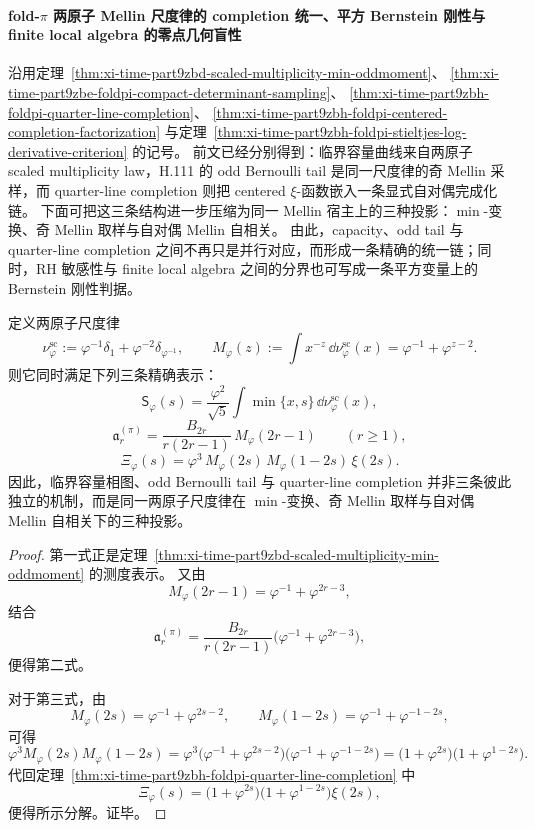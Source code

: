 \paragraph{fold-\texorpdfstring{$\pi$}{pi} 两原子 Mellin 尺度律的 completion 统一、平方 Bernstein 刚性与 finite local algebra 的零点几何盲性}
沿用定理~\ref{thm:xi-time-part9zbd-scaled-multiplicity-min-oddmoment}、
\ref{thm:xi-time-part9zbe-foldpi-compact-determinant-sampling}、
\ref{thm:xi-time-part9zbh-foldpi-quarter-line-completion}、
\ref{thm:xi-time-part9zbh-foldpi-centered-completion-factorization}
与定理~\ref{thm:xi-time-part9zbh-foldpi-stieltjes-log-derivative-criterion} 的记号。
前文已经分别得到：临界容量曲线来自两原子 scaled multiplicity law，H.111 的 odd Bernoulli tail 是同一尺度律的奇 Mellin 采样，而 quarter-line completion 则把 centered \(\xi\)-函数嵌入一条显式自对偶完成化链。
下面可把这三条结构进一步压缩为同一 Mellin 宿主上的三种投影：\(\min\)-变换、奇 Mellin 取样与自对偶 Mellin 自相关。
由此，capacity、odd tail 与 quarter-line completion 之间不再只是并行对应，而形成一条精确的统一链；同时，RH 敏感性与 finite local algebra 之间的分界也可写成一条平方变量上的 Bernstein 刚性判据。

\begin{theorem}\label{thm:xi-time-part9zbha-twoatomic-mellin-triple-unification}
定义两原子尺度律
\[
\nu_\varphi^{\mathrm{sc}}
:=
\varphi^{-1}\delta_1+\varphi^{-2}\delta_{\varphi^{-1}},
\qquad
M_\varphi(z)
:=
\int x^{-z}\,\dd\nu_\varphi^{\mathrm{sc}}(x)
=
\varphi^{-1}+\varphi^{z-2}.
\]
则它同时满足下列三条精确表示：
\[
\mathsf S_\varphi(s)
=
\frac{\varphi^2}{\sqrt5}
\int \min\{x,s\}\,\dd\nu_\varphi^{\mathrm{sc}}(x),
\]
\[
\mathfrak a_r^{(\pi)}
=
\frac{B_{2r}}{r(2r-1)}\,M_\varphi(2r-1)
\qquad (r\ge 1),
\]
\[
\Xi_\varphi(s)
=
\varphi^3\,M_\varphi(2s)\,M_\varphi(1-2s)\,\xi(2s).
\]
因此，临界容量相图、odd Bernoulli tail 与 quarter-line completion 并非三条彼此独立的机制，而是同一两原子尺度律在 \(\min\)-变换、奇 Mellin 取样与自对偶 Mellin 自相关下的三种投影。
\end{theorem}
\begin{proof}
第一式正是定理~\ref{thm:xi-time-part9zbd-scaled-multiplicity-min-oddmoment} 的测度表示。
又由
\[
M_\varphi(2r-1)
=
\varphi^{-1}+\varphi^{2r-3},
\]
结合
\[
\mathfrak a_r^{(\pi)}
=
\frac{B_{2r}}{r(2r-1)}
\bigl(\varphi^{-1}+\varphi^{2r-3}\bigr),
\]
便得第二式。

对于第三式，由
\[
M_\varphi(2s)=\varphi^{-1}+\varphi^{2s-2},
\qquad
M_\varphi(1-2s)=\varphi^{-1}+\varphi^{-1-2s},
\]
可得
\[
\varphi^3M_\varphi(2s)M_\varphi(1-2s)
=
\varphi^3\bigl(\varphi^{-1}+\varphi^{2s-2}\bigr)\bigl(\varphi^{-1}+\varphi^{-1-2s}\bigr)
=
\bigl(1+\varphi^{2s}\bigr)\bigl(1+\varphi^{1-2s}\bigr).
\]
代回定理~\ref{thm:xi-time-part9zbh-foldpi-quarter-line-completion} 中
\[
\Xi_\varphi(s)
=
\bigl(1+\varphi^{2s}\bigr)\bigl(1+\varphi^{1-2s}\bigr)\xi(2s),
\]
便得所示分解。证毕。
\end{proof}

